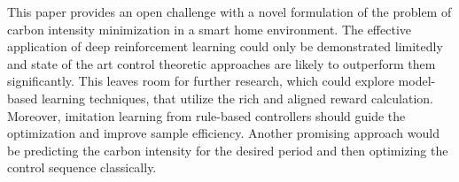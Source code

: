 This paper provides an open challenge with a novel formulation of the problem of carbon intensity minimization in a smart home environment. The effective application of deep reinforcement learning could only be demonstrated limitedly and state of the art control theoretic approaches are likely to outperform them significantly. This leaves room for further research, which could explore model-based learning techniques, that utilize the rich and aligned reward calculation. Moreover, imitation learning from rule-based controllers should guide the optimization and improve sample efficiency. Another promising approach would be predicting the carbon intensity for the desired period and then optimizing the control sequence classically.